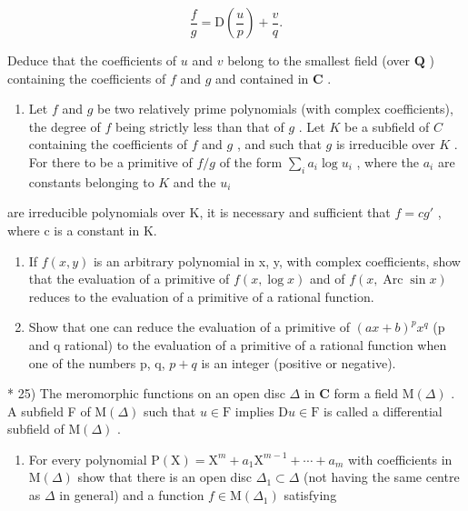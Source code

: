 \[
{\frac {f}{g}} = \mathrm{D} \left({\frac {u}{p}}\right) + {\frac {v}{q}}.
\]

Deduce that the coefficients of \(u\) and \(v\) belong to the smallest field (over \(\mathbf{Q}\) ) containing the coefficients of \(f\) and \(g\) and contained in \(\mathbf{C}\) .

\begin{enumerate}
\def\labelenumi{\arabic{enumi})}
\setcounter{enumi}{21}
\tightlist
\item
  Let \(f\) and \(g\) be two relatively prime polynomials (with complex coefficients), the degree of \(f\) being strictly less than that of \(g\) . Let \(K\) be a subfield of \(C\) containing the coefficients of \(f\) and \(g\) , and such that \(g\) is irreducible over \(K\) . For there to be a primitive of \(f / g\) of the form \(\sum_{i} a_i \log u_i\) , where the \(a_i\) are constants belonging to \(K\) and the \(u_i\)
\end{enumerate}

are irreducible polynomials over K, it is necessary and sufficient that \(f = cg'\) , where c is a constant in K.

\begin{enumerate}
\def\labelenumi{\arabic{enumi})}
\setcounter{enumi}{22}
\item
  If \(f(x, y)\) is an arbitrary polynomial in x, y, with complex coefficients, show that the evaluation of a primitive of \(f(x, \log x)\) and of \(f(x, \operatorname{Arc} \sin x)\) reduces to the evaluation of a primitive of a rational function.
\item
  Show that one can reduce the evaluation of a primitive of \((ax + b)^{p} x^{q}\) (p and q rational) to the evaluation of a primitive of a rational function when one of the numbers p, q, \(p + q\) is an integer (positive or negative).
\end{enumerate}

* 25) The meromorphic functions on an open disc \(\Delta\) in \(\mathbf{C}\) form a field \(\mathrm{M}(\Delta)\) . A subfield F of \(\mathrm{M}(\Delta)\) such that \(u \in \mathrm{F}\) implies \(\mathrm{D}u \in \mathrm{F}\) is called a differential subfield of \(\mathrm{M}(\Delta)\) .

\begin{enumerate}
\def\labelenumi{\alph{enumi})}
\tightlist
\item
  For every polynomial \(\mathrm{P}(\mathrm{X})=\mathrm{X}^{m}+a_{1}\mathrm{X}^{m-1}+\cdots+a_{m}\) with coefficients in \(\mathrm{M}(\Delta)\) show that there is an open disc \(\Delta_{1}\subset\Delta\) (not having the same centre as \(\Delta\) in general) and a function \(f\in\mathrm{M}(\Delta_{1})\) satisfying
\end{enumerate}


